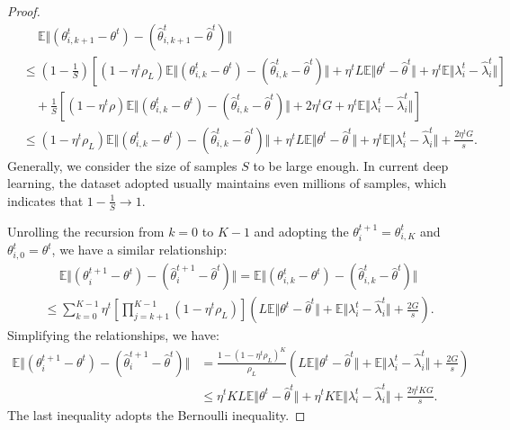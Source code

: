 \begin{proof}
\begin{align*}
        &\quad \ \mathbb{E}\Vert\left(\theta_{i,k+1}^t - \theta^t \right) - \left(\hat{\theta}_{i,k+1}^t - \hat{\theta}^t \right)\Vert\\
        &\leq \left(1-\frac{1}{S}\right)\left[\left(1-\eta^t\rho_L\right)\mathbb{E}\Vert\left(\theta_{i,k}^t - \theta^t \right) - \left(\hat{\theta}_{i,k}^t - \hat{\theta}^t \right)\Vert + \eta^t L\mathbb{E}\Vert \theta^t - \hat{\theta}^t\Vert + \eta^t\mathbb{E}\Vert\lambda_i^t - \hat{\lambda}_i^t\Vert\right]\\
        &\quad + \frac{1}{S}\left[\left(1-\eta^t\rho\right)\mathbb{E}\Vert\left(\theta_{i,k}^t - \theta^t\right) - \left(\hat{\theta}_{i,k}^t - \hat{\theta}^t \right)\Vert + 2\eta^t G + \eta^t\mathbb{E}\Vert \lambda_i^t - \hat{\lambda}_i^t\Vert\right]\\
        &\leq \left(1 - \eta^t\rho_L\right)\mathbb{E}\Vert\left(\theta_{i,k}^t - \theta^t \right) - \left(\hat{\theta}_{i,k}^t - \hat{\theta}^t \right)\Vert + \eta^t L\mathbb{E}\Vert \theta^t - \hat{\theta}^t\Vert + \eta^t\mathbb{E}\Vert\lambda_i^t - \hat{\lambda}_i^t\Vert + \frac{2\eta^t G}{s}.
    \end{align*}
    Generally, we consider the size of samples $S$ to be large enough. In current deep learning, the dataset adopted usually maintains even millions of samples, which indicates that $1-\frac{1}{S}\rightarrow 1$.
    
    Unrolling the recursion from $k=0$ to $K-1$ and adopting the $\theta_i^{t+1}=\theta_{i,K}^t$ and $\theta_{i,0}^t = \theta^t$, we have a similar relationship:
    \begin{align*}
        &\quad \ \mathbb{E}\Vert\left(\theta_{i}^{t+1} - \theta^t \right) - \left(\hat{\theta}_{i}^{t+1} - \hat{\theta}^t \right)\Vert =  \mathbb{E}\Vert\left(\theta_{i,k}^t - \theta^t \right) - \left(\hat{\theta}_{i,k}^t - \hat{\theta}^t \right)\Vert\\
        &\leq \sum_{k=0}^{K-1}\eta^t\left[\prod_{j=k+1}^{K-1}\left(1-\eta^t\rho_L \right)\right]\left(L\mathbb{E}\Vert \theta^t - \hat{\theta}^t\Vert + \mathbb{E}\Vert \lambda_i^t - \hat{\lambda}_i^t\Vert + \frac{2G}{s}\right).
    \end{align*}
    Simplifying the relationships, we have:
    \begin{align*}
        \mathbb{E}\Vert\left(\theta_{i}^{t+1} - \theta^t \right) - \left(\hat{\theta}_{i}^{t+1} - \hat{\theta}^t \right)\Vert
        &= \frac{1-\left(1-\eta^t\rho_L\right)^K}{\rho_L}\left(L\mathbb{E}\Vert \theta^t - \hat{\theta}^t\Vert + \mathbb{E}\Vert \lambda_i^t - \hat{\lambda}_i^t\Vert + \frac{2G}{s}\right)\\
        &\leq \eta^t KL\mathbb{E}\Vert \theta^t - \hat{\theta}^t\Vert + \eta^t K\mathbb{E}\Vert \lambda_i^t - \hat{\lambda}_i^t\Vert + \frac{2\eta^t KG}{s}.
    \end{align*}
    The last inequality adopts the Bernoulli inequality.
\end{proof}

